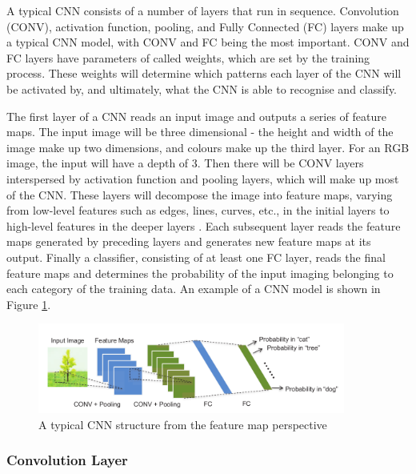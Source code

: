 \documentclass[12pt]{article}
\begin{document}
A typical CNN consists of a number of layers that run in sequence. Convolution (CONV), activation function, pooling, and Fully Connected (FC) layers make up a typical CNN model, with CONV and FC being the most important. CONV and FC layers have parameters of called weights, which are set by the training process. These weights will determine which patterns each layer of the CNN will be activated by, and ultimately, what the CNN is able to recognise and classify. 

The first layer of a CNN reads an input image and outputs a series of feature maps. The input image will be three dimensional - the height and width of the image make up two dimensions, and colours make up the third layer. For an RGB image, the input will have a depth of 3. Then there will be CONV layers interspersed by activation function and pooling layers, which will make up most of the CNN. These layers will decompose the image into feature maps, varying from low-level features such as edges, lines, curves, etc., in the initial layers to high-level features in the deeper layers \cite{SudaFpgaAccelerator}. Each subsequent layer reads the feature maps generated by preceding layers and generates new feature maps at its output. Finally a classifier, consisting of at least one FC layer, reads the final feature maps and determines the probability of the input imaging belonging to each category of the training data. An example of a CNN model is shown in Figure \ref{fig:typicalCNN}.

\begin{figure}[h]
\centering
\includegraphics[width=0.9\textwidth]{figures/typicalCnn}
\caption{A typical CNN structure from the feature map perspective \cite{embeddedFpgaCnn} \label{fig:typicalCNN}}
\end{figure}

\subsubsection{Convolution Layer}
\label{sec:Background-CNN-Conv}
\end{document}
